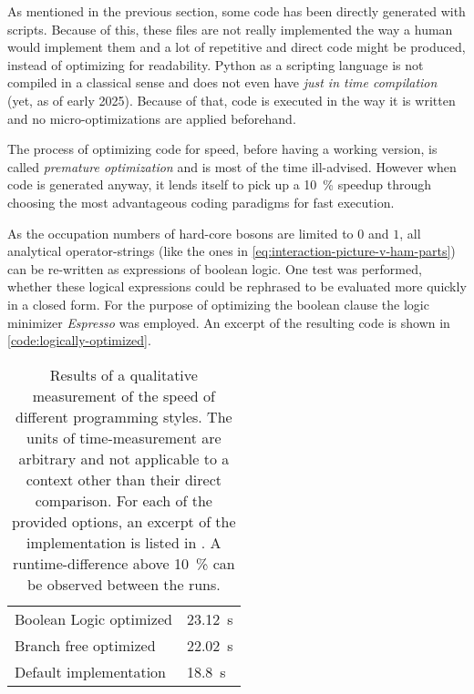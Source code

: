 As mentioned in the previous section, some code has been directly generated with scripts.
Because of this, these files are not really implemented the way a human would implement them and a lot of repetitive and direct code might be produced, instead of optimizing for readability.
Python as a scripting language is not compiled in a classical sense and does not even have \emph{just in time compilation} (yet, as of early 2025).
Because of that, code is executed in the way it is written and no micro-optimizations are applied beforehand.

The process of optimizing code for speed, before having a working version, is called \emph{premature optimization} and is most of the time ill-advised.
However when code is generated anyway, it lends itself to pick up a \SI{10}{\percent} speedup through choosing the most advantageous coding paradigms for fast execution.

As the occupation numbers of hard-core bosons are limited to $0$ and $1$, all analytical operator-strings (like the ones in \autoref{eq:interaction-picture-v-ham-parts}) can be re-written as expressions of boolean logic.
One test was performed, whether these logical expressions could be rephrased to be evaluated more quickly in a closed form. 
For the purpose of optimizing the boolean clause the logic minimizer \emph{Espresso} \cite{espresso} was employed.
An excerpt of the resulting code is shown in \ref{code:logically-optimized}.

\begin{table}[htbp]
    \centering
    \begin{tabular}{l|l} 
        \toprule
             Boolean Logic optimized & \SI{23.12}{\second}\\
             Branch free optimized & \SI{22.02}{\second}\\
             Default implementation & \SI{18.8}{\second}\\
        \bottomrule
    \end{tabular}
    \vspace{0.5cm}
    \caption{
        Results of a qualitative measurement of the speed of different programming styles.
        The units of time-measurement are arbitrary and not applicable to a context other than their direct comparison.
        For each of the provided options, an excerpt of the implementation is listed in .
        A runtime-difference above \SI{10}{\percent} can be observed between the runs.
    }
    \label{table:style-optimizations-runtime}
\end{table}

